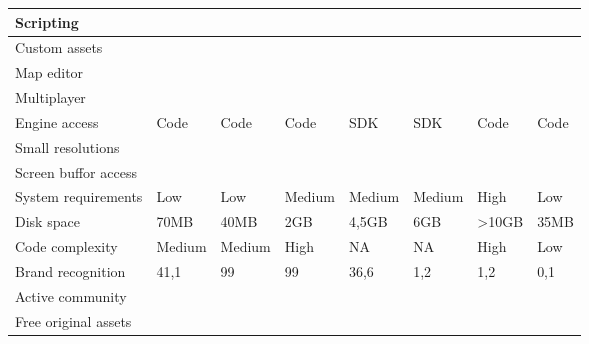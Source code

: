 \documentclass[english,bachelor,a4paper,twoside]{ppfcmthesis}
\newcommand*\OK{\ding{51}}
\begin{document}
\begin{table}[]
\begin{tabular}{|p{2cm}||p{1.3cm}|p{1.3cm}|p{1.3cm}|p{1.3cm}|p{1.3cm}|p{1.3cm}|p{1.3cm}|}
Scripting                 &                  & \OK   & \OK       & \OK         & \OK                    & \OK               & \OK         \\ \hline
Custom assets             & \OK              & \OK   & \OK       & \OK         & \OK                    & \OK               & \OK         \\ \hline
Map editor                & \OK              & \OK   & \OK       & \OK         & \OK                    & \OK               & \OK         \\ \hline
Multiplayer               & \OK              & \OK   & \OK       &             & \OK                    & \OK               & \OK         \\ \hline
Engine access             & Code             & Code  & Code      & SDK         & SDK                    & Code               & Code        \\ \hline
Small resolutions         & \OK              & \OK   & \OK       & \OK         & \OK                    & \OK               & \OK         \\ \hline
Screen buffor access      & \OK              & \OK   & \OK       &             &                        & \OK               & \OK         \\ \hline
System requirements       & Low              & Low   & Medium    & Medium      & Medium                 & High              & Low         \\ \hline
Disk space                & 70MB             & 40MB  & 2GB       & 4,5GB       & 6GB                    & \textgreater10GB\footnotemark  & 35MB        \\ \hline
Code complexity           & Medium           & Medium& High      & NA          & NA                     & High              & Low         \\ \hline
Brand recognition         & 41,1             & 99    & 99        & 36,6        & 1,2                    & 1,2               & 0,1         \\ \hline
Active community          & \OK              & \OK   & \OK       & \OK         &                        & \OK               &             \\ \hline
Free original assets      &                  &       &           &             &                        & \OK               & \OK         \\ \hline
\end{tabular}
\end{table}
\addtocounter{footnote}{-2}
  
\end{document}
